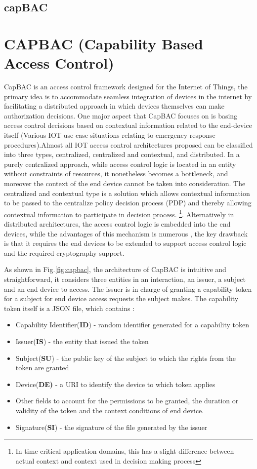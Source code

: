 \subsection{capBAC}
\label{subsec:capbacsystem}

\section{CAPBAC (Capability Based Access Control)}
CapBAC\cite{capbac} is an access control framework designed for the Internet of Things, the primary idea is to accommodate seamless integration of devices in the internet by facilitating a distributed approach in which devices themselves can make 
authorization decisions.
One major aspect that CapBAC focuses on is basing access control decisions based on contextual information related to the end-device itself (Various IOT use-case situations relating to emergency response procedures).Almost all IOT access control architectures proposed can be classified into three types, centralized, centralized and contextual, and distributed. In a purely centralized approach, while access control logic is located in an entity without constraints of resources, it nonetheless becomes a bottleneck, and moreover the context of the end device cannot be taken into consideration. The centralized and contextual type is a solution which allows contextual information to be passed to the centralize policy decision process (PDP) and thereby allowing contextual information to participate in decision process. \footnote{In time critical application domains, this has a slight difference between actual context and context used in decision making process}. Alternatively in distributed architectures, the access control logic is embedded into the end devices, while the advantages of this mechanism is numerous , the key drawback is that it requires the end devices to be extended to support access control logic and the required cryptography support.

As shown in Fig.\ref{fig:capbac}, the architecture of CapBAC is intuitive and straightforward, it considers three entities in an interaction, an issuer, a subject and an end device to access. The issuer is in charge of granting a capability token for a subject for end device access requests the subject makes. The capability token itself is a JSON file, which contains :
\begin{itemize}
\item Capability Identifier(\textbf{ID}) - random identifier generated for a capability token
\item Issuer(\textbf{IS}) - the entity that issued the token
\item Subject(\textbf{SU}) - the public key of the subject to which the rights from the token are granted
\item Device(\textbf{DE)} - a URI to identify the device to which token applies  
\item Other fields to account for the permissions to be granted, the duration or validity of the token and the context conditions of end device. 
\item Signature(\textbf{SI}) - the signature of the file generated by the issuer
\end{itemize}

